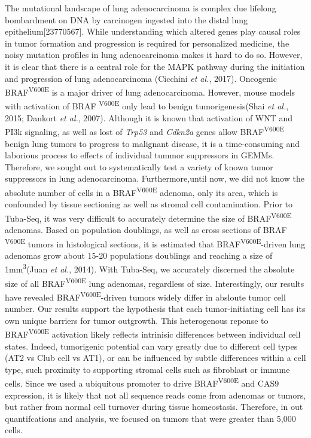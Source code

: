 The mutational landscape of lung adenocarcinoma is complex due lifelong bombardment on DNA by carcinogen ingested into the distal lung epithelium{[}23770567{]}.
While understanding which altered genes play causal roles in tumor formation and progression is required for personalized medicine, the noisy mutation profiles in lung adenocarcinoma makes it hard to do so.
However, it is clear that there is a central role for the MAPK pathway during the initiation and progression of lung adenocarcinoma (Cicchini \emph{et al.}, 2017).
Oncogenic BRAF\textsuperscript{V600E} is a major driver of lung adenocarcinoma.
However, mouse models with activation of BRAF \textsuperscript{V600E} only lead to benign tumorigenesis(Shai \emph{et al.}, 2015; Dankort \emph{et al.}, 2007).
Although it is known that activation of WNT and PI3k signaling, as well as lost of \emph{Trp53} and \emph{Cdkn2a} genes allow BRAF\textsuperscript{V600E} benign lung tumors to progress to malignant disease, it is a time-consuming and laborious process to effects of individual tummor suppressors in GEMMs.
Therefore, we sought out to systematically test a variety of known tumor suppressors in lung adenocarcinoma.
Furthermore,until now, we did not know the absolute number of cells in a BRAF\textsuperscript{V600E} adenoma, only its area, which is confounded by tissue sectioning as well as stromal cell contamination.
Prior to Tuba-Seq, it was very difficult to accurately determine the size of BRAF\textsuperscript{V600E} adenomas.
Based on population doublings, as well as cross sections of BRAF \textsuperscript{V600E} tumors in histological sections, it is estimated that BRAF\textsuperscript{V600E}-driven lung adenomas grow about 15-20 populations doublings and reaching a size of 1mm\textsuperscript{3}(Juan \emph{et al.}, 2014).
With Tuba-Seq, we accurately discerned the absolute size of all BRAF\textsuperscript{V600E} lung adenomas, regardless of size.
Interestingly, our results have revealed BRAF\textsuperscript{V600E}-driven tumors widely differ in absloute tumor cell number. Our results support the hypothesis that each tumor-initiating cell has its own unique barriers for tumor outgrowth.
This heterogenous reponse to BRAF\textsuperscript{V600E} activation likely reflects intrinisic differences between individual cell states.
Indeed, tumorigenic potential can vary greatly due to different cell types (AT2 vs Club cell vs AT1), or can be influenced by subtle differences within a cell type, such proximity to supporting stromal cells such as fibroblast or immune cells.
Since we used a ubiquitous promoter to drive BRAF\textsuperscript{V600E} and CAS9 expression, it is likely that not all sequence reads come from adenomas or tumors, but rather from normal cell turnover during tissue homeostasis.
Therefore, in out quantifcations and analysis, we focused on tumors that were greater than 5,000 cells.


